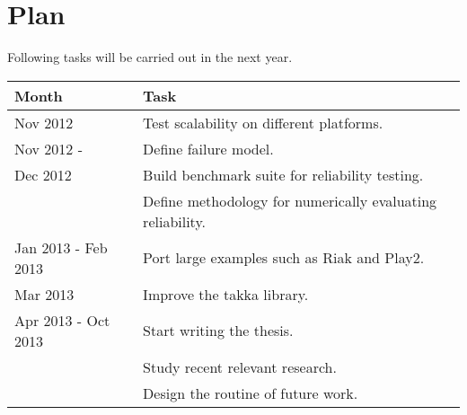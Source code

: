 \section{Plan}

Following tasks will be carried out in the next year.

\begin{tabular}{ | p{2 cm} | p{9.9 cm} | }
  \hline  
  Month & Task \\
   \hline
  Nov 2012 & Test scalability on different platforms.\\ 
  \hline
  Nov 2012 -  & Define failure model. \\
  Dec 2012    &  Build benchmark suite for reliability testing.\\
                         & Define methodology for numerically evaluating reliability. \\
  \hline
  Jan 2013 - Feb 2013    & Port large examples such as Riak and Play2. \\
  \hline
  Mar 2013 & Improve the takka library.  \\
  \hline
  Apr 2013 - Oct 2013 & Start writing the thesis. \\
                     & Study recent relevant research.   \\
                     & Design the routine of future work. \\
  \hline
\end{tabular}
